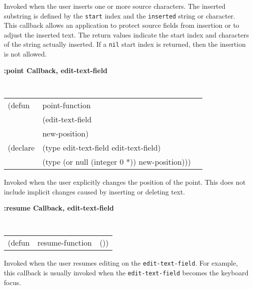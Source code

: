 \begin{flushright} \parbox[t]{6.125in}{
Invoked when the user inserts one or more source
characters.  The inserted
substring is defined by the {\tt start} index and the {\tt inserted} string or character.  This callback
allows an application to protect source fields from insertion or to adjust the
inserted text. The return values indicate the start index and characters of the
string actually inserted. If a {\tt nil} start index is returned, then the
insertion is not allowed.

}\end{flushright}

        
{\samepage
{\large {\bf :point \hfill Callback, edit-text-field}} 
\begin{flushright} 
\parbox[t]{6.125in}{
\tt
\begin{tabular}{lll}
\raggedright
(defun & point-function & \\ 
& (edit-text-field\\
& new-position) \\
(declare & (type  edit-text-field  edit-text-field)\\
         & (type  (or null (integer 0 *))  new-position)))
\end{tabular}
\rm

}\end{flushright}}

\begin{flushright} \parbox[t]{6.125in}{
Invoked when the user explicitly changes the position of the
point.
This does not include implicit changes caused by inserting or deleting text.

}\end{flushright}


{\samepage
{\large {\bf :resume \hfill Callback, edit-text-field}} 
\begin{flushright} 
\parbox[t]{6.125in}{
\tt
\begin{tabular}{lll}
\raggedright
(defun & resume-function & ())
\end{tabular}
\rm

}\end{flushright}}

\begin{flushright} \parbox[t]{6.125in}{
Invoked when the user resumes editing on the {\tt edit-text-field}. For
example, this callback is usually invoked when the {\tt edit-text-field} becomes
the keyboard focus. 

}\end{flushright}

